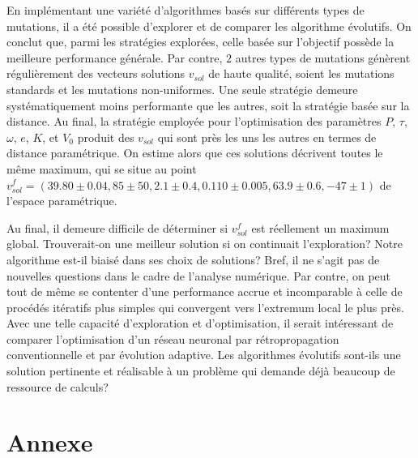 \documentclass{article}
\begin{document}
En implémentant une variété d'algorithmes basés sur différents types de mutations, il a été possible d'explorer et de comparer les algorithme évolutifs. On conclut que, parmi les stratégies explorées, celle basée sur l'objectif possède la meilleure performance générale. Par contre, $2$ autres types de mutations génèrent régulièrement des vecteurs solutions $v_{sol}$ de haute qualité, soient les mutations standards et les mutations non-uniformes. Une seule stratégie demeure systématiquement moins performante que les autres, soit la stratégie basée sur la distance. Au final, la stratégie employée pour l'optimisation des paramètres $P$, $\tau$, $\omega$, $e$, $K$, et $V_0$ produit des $v_{sol}$ qui sont près les uns les autres en termes de distance paramétrique. On estime alors que ces solutions décrivent toutes le même maximum, qui se situe au point $v^f_{sol} = (39.80\pm0.04, 85\pm50, 2.1\pm0.4, 0.110\pm0.005, 63.9\pm0.6, -47\pm1)$ de l'espace paramétrique.\par
Au final, il demeure difficile de déterminer si $v^f_{sol}$ est réellement un maximum global. Trouverait-on une meilleur solution si on continuait l'exploration? Notre algorithme est-il biaisé dans ses choix de solutions? Bref, il ne s'agit pas de nouvelles questions dans le cadre de l'analyse numérique. Par contre, on peut tout de même se contenter d'une performance accrue et incomparable à celle de procédés itératifs plus simples qui convergent vers l'extremum local le plus près. Avec une telle capacité d'exploration et d'optimisation, il serait intéressant de comparer l'optimisation d'un réseau neuronal par rétropropagation conventionnelle et par évolution adaptive. Les algorithmes évolutifs sont-ils une solution pertinente et réalisable à un problème qui demande déjà beaucoup de ressource de calculs?


\pagebreak

\section{Annexe}
\end{document}
